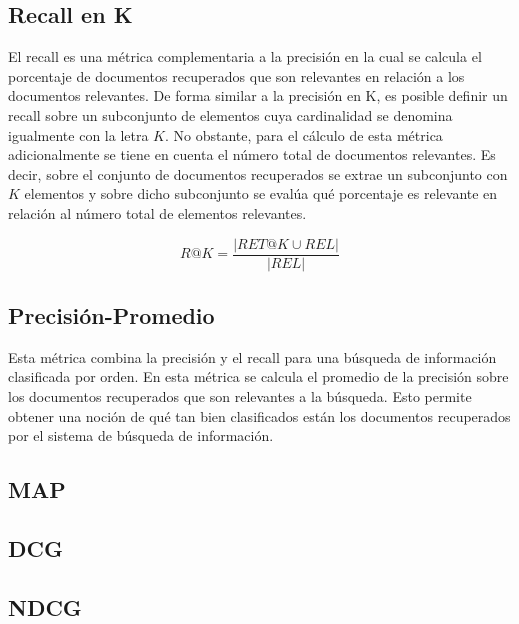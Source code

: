 \subsection{Recall en K}
El recall es una métrica complementaria a la precisión en la cual se calcula el porcentaje de documentos recuperados que son relevantes en relación a los documentos relevantes. De forma similar a la precisión en K, es posible definir un recall sobre un subconjunto de elementos cuya cardinalidad se denomina igualmente con la letra $K$. No obstante, para el cálculo de esta métrica adicionalmente se tiene en cuenta el número total de documentos relevantes. Es decir, sobre el conjunto de documentos recuperados se extrae un subconjunto con $K$ elementos y sobre dicho subconjunto se evalúa qué porcentaje es relevante en relación al número total de elementos relevantes.

\begin{equation}
    R@K = \frac{|RET@K \cup REL|}{|REL|}
    \label{eq:recallatk}
\end{equation}

\subsection{Precisión-Promedio}
Esta métrica combina la precisión y el recall para una búsqueda de información clasificada por orden. En esta métrica se calcula el promedio de la precisión sobre los documentos recuperados que son relevantes a la búsqueda. Esto permite obtener una noción de qué tan bien clasificados están los documentos recuperados por el sistema de búsqueda de información.

\subsection{MAP}

\subsection{DCG}

\subsection{NDCG}
